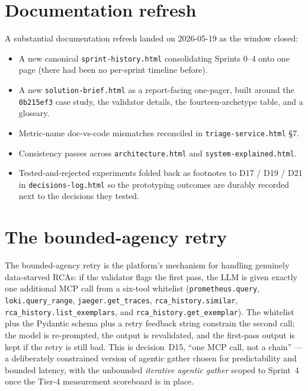 \documentclass[11pt,a4paper,oneside]{report}
\begin{document}
\section{Documentation refresh}

A substantial documentation refresh landed on 2026-05-19 as the
window closed:

\begin{itemize}
  \item A new canonical \texttt{sprint-history.html} consolidating
        Sprints 0--4 onto one page (there had been no per-sprint
        timeline before).
  \item A new \texttt{solution-brief.html} as a report-facing
        one-pager, built around the \texttt{0b215ef3} case study, the
        validator details, the fourteen-archetype table, and a
        glossary.
  \item Metric-name doc-vs-code mismatches reconciled in
        \texttt{triage-service.html} \S7.
  \item Consistency passes across \texttt{architecture.html} and
        \texttt{system-explained.html}.
  \item Tested-and-rejected experiments folded back as footnotes to
        D17 / D19 / D21 in \texttt{decisions-log.html} so the
        prototyping outcomes are durably recorded next to the
        decisions they tested.
\end{itemize}

\section{The bounded-agency retry}
\label{sec:bounded-agency}

The bounded-agency retry is the platform's mechanism for handling
genuinely data-starved RCAs: if the validator flags the first pass,
the LLM is given exactly one additional MCP call from a six-tool
whitelist (\texttt{prometheus.query}, \texttt{loki.query\_range},
\texttt{jaeger.get\_traces}, \texttt{rca\_history.similar},
\texttt{rca\_history.list\_exemplars}, and
\texttt{rca\_history.get\_exemplar}).  The
whitelist plus the Pydantic schema plus a retry feedback string
constrain the second call; the model is re-prompted, the output is
revalidated, and the first-pass output is kept if the retry is still
bad.  This is decision~D15, ``one MCP call, not a chain'' --- a
deliberately constrained version of agentic gather chosen for
predictability and bounded latency, with the unbounded
\emph{iterative agentic gather} scoped to Sprint~4 once the Tier-4
measurement scoreboard is in place.
\end{document}
